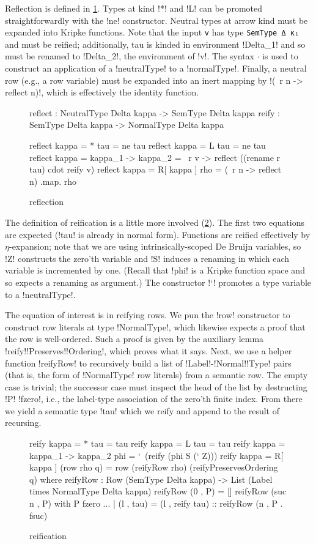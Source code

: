 \documentclass[sigplan,10pt,review]{acmart}\settopmatter{printfolios=true,printccs=false,printacmref=false}
\begin{document}
Reflection is defined in \cref{fig:reflection}. Types at kind !*! and !L! can be promoted straightforwardly with the !ne! constructor. Neutral types at arrow kind must be expanded into Kripke functions. Note that the input \verb!v! has type \verb!SemType Δ κ₁! and must be reified; additionally, tau is kinded in environment !Delta_1! and so must be renamed to !Delta_2!, the environment of !v!. The syntax $\cdot$ is used to construct an application of a !neutralType! to a !normalType!. Finally, a neutral row (e.g., a row variable) must be expanded into an inert mapping by !(\ r n -> reflect n)!, which is effectively the identity function. 
\begin{figure}
\begin{agda}
reflect : NeutralType Delta kappa -> SemType Delta kappa 
reify : SemType Delta kappa -> NormalType Delta kappa

reflect {kappa = *} tau = ne tau
reflect {kappa = L} tau = ne tau
reflect {kappa = kappa_1 -> kappa_2} = 
  \ r v -> reflect ((rename r tau) cdot reify v)
reflect {kappa = R[ kappa ]} rho = (\ r n -> reflect n) .map. rho
\end{agda}
\caption{reflection}
\label{fig:reflection}
\end{figure}

The definition of reification is a little more involved (\cref{fig:reification}). The first two equations are expected (!tau! is already in normal form). Functions are reified effectively by $\eta$\--expan\-sion; note that we are using intrinsically-scoped De Bruijn variables, so !Z! constructs the zero'th variable and !S! induces a renaming in which each variable is incremented by one. (Recall that !phi! is a Kripke function space and so expects a renaming as argument.) The constructor !`! promotes a type variable to a !neutralType!. 

The equation of interest is in reifying rows. We pun the !row! constructor to construct row literals at type !NormalType!, which likewise expects a proof that the row is well-ordered. Such a proof is given by the auxiliary lemma !reify!\-!Preserves!\-!Ordering!, which proves what it says. Next, we use a helper function !reifyRow! to recursively build a list of !Label!\--!Normal!\-!Type! pairs (that is, the form of !NormalType! row literals) from a semantic row. The empty case is trivial; the successor case must inspect the head of the list by destructing !P! !fzero!, i.e., the label\--type association of the zero'th finite index. From there we yield a semantic type !tau! which we reify and append to the result of recursing.
\begin{figure}
\begin{agda}
reify {kappa = *} tau = tau
reify {kappa = L} tau = tau
reify {kappa = kappa_1 -> kappa_2} phi = `\ (reify (phi S (` Z)))
reify {kappa = R[ kappa ]} (row rho q) = 
  row (reifyRow rho) (reifyPreservesOrdering q)
  where
    reifyRow : Row (SemType Delta kappa) -> 
               List (Label times NormalType Delta kappa)
    reifyRow (0 , P) = [] 
    reifyRow (suc n , P) with P fzero 
    ... | (l , tau) = 
      (l , reify tau) :: reifyRow (n , P . fsuc)
\end{agda}
\caption{reification}
\label{fig:reification}
\end{figure}
\end{document}
